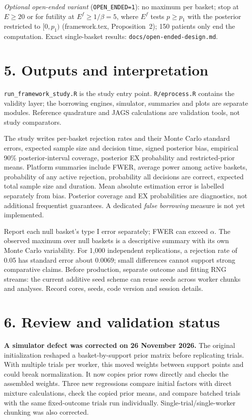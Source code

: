 \documentclass[10pt,a4paper]{article}
\begin{document}
\emph{Optional open-ended variant} (\texttt{OPEN\_ENDED=1}): no maximum per
basket; stop at $E\ge20$ or for futility at $E^f\ge1/\beta=5$, where $E^f$
tests $p\ge p_1$ with the posterior restricted to $[0,p_1)$ (framework.tex,
Proposition~2); 150 patients only end the computation. Exact single-basket
results: \texttt{docs/open-ended-design.md}.

\newpage
\section*{5. Outputs and interpretation}
\texttt{run\_framework\_study.R} is the study entry point.
\texttt{R/eprocess.R} contains the validity layer; the borrowing engines,
simulator, summaries and plots are separate modules. Reference quadrature
and JAGS calculations are validation tools, not study comparators.

The study writes per-basket rejection rates and their Monte Carlo standard
errors, expected sample size and decision time, signed posterior bias,
empirical 90\% posterior-interval coverage, posterior EX probability and
restricted-prior means. Platform summaries include FWER, average power among
active baskets, probability of any active rejection, probability all decisions
are correct, expected total sample size and duration. Mean absolute
estimation error is labelled separately from bias.
Posterior coverage and EX probabilities are diagnostics, not additional
frequentist guarantees. A dedicated \emph{false borrowing} measure is not yet
implemented.

Report each null basket's type I error separately; FWER can exceed $\alpha$.
The observed maximum over null baskets is a descriptive summary with its own
Monte Carlo variability. For 1,000 independent replications, a rejection rate
of 0.05 has standard error about $0.0069$; small differences cannot support
strong comparative claims. Before production, separate outcome and fitting
RNG streams: the current additive seed scheme can reuse seeds across worker
chunks and analyses. Record cores, seeds, code version and session details.

\section*{6. Review and validation status}
\textbf{A simulator defect was corrected on 26 November 2026.}
The original initialization reshaped a basket-by-support prior matrix before
replicating trials. With multiple trials per worker, this moved weights
between support points and could break normalization. It now copies prior
rows directly and checks the assembled weights. Three new regressions compare
initial factors with direct mixture calculations, check the copied prior
means, and compare batched trials with the same fixed-outcome trials run
individually. Single-trial/single-worker chunking was also corrected.
\end{document}
